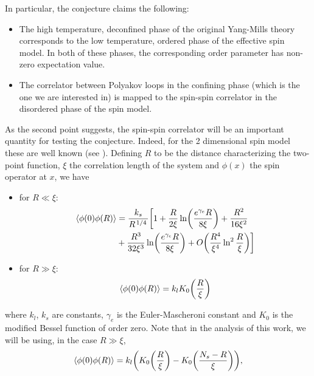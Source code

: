\documentclass[reqno,12pt]{article}
\numberwithin{equation}{section}
\begin{document}
In particular, the conjecture claims the following:
\begin{itemize}
	\item The high temperature, deconfined phase of the original Yang-Mills theory corresponds to the low temperature, ordered phase of 
	the effective spin model. In both of these phases, the corresponding order parameter has non-zero expectation value.

	\item The correlator between Polyakov loops in the confining phase (which is the one we are interested in) is mapped to the spin-spin
	correlator in the disordered phase of the spin model. 
\end{itemize}

As the second point suggests, the spin-spin correlator will be an important quantity for testing the conjecture. Indeed, for the 2 dimensional
spin model these are well known (see \cite{caristo}). Defining $R$ to be the distance characterizing the two-point function, $\xi$ the
correlation length of the system and $\phi(x)$ the spin operator at $x$, we have
\begin{itemize}
	\item for $R \ll \xi$:
		\begin{equation}
			\begin{aligned}
				\expval{\phi(0) \phi(R)} &= \frac{k_s}{R^{\flatfrac{1}{4}}} \biggl[ 1 + \frac{R}{2\xi} \ln(\frac{e^{\gamma_e}R}{8\xi}) + \frac{R^2}{16\xi^2} \\
				&+ \frac{R^3}{32\xi^3} \ln(\frac{e^{\gamma_e}R}{8\xi}) + O\qty(\frac{R^4}{\xi^4}\ln^2\frac{R}{\xi}) \biggr]
			\end{aligned}
		\end{equation}

	\item for $R \gg \xi$:
		\begin{equation} \label{eq:large_distance_spin}
			\expval{\phi(0) \phi(R)} = k_l K_0\qty(\frac{R}{\xi})
		\end{equation}
\end{itemize}

where $k_l$, $k_s$ are constants, $\gamma_e$ is the Euler-Mascheroni constant and $K_0$ is the modified Bessel function of order zero. 
Note that in the analysis of this work, we will be using, in the case $R \gg \xi$,
\begin{equation}
	\expval{\phi(0) \phi(R)} = k_l \qty(K_0\qty(\frac{R}{\xi}) - K_0\qty(\frac{N_s - R}{\xi})),
\end{equation}
\end{document}
